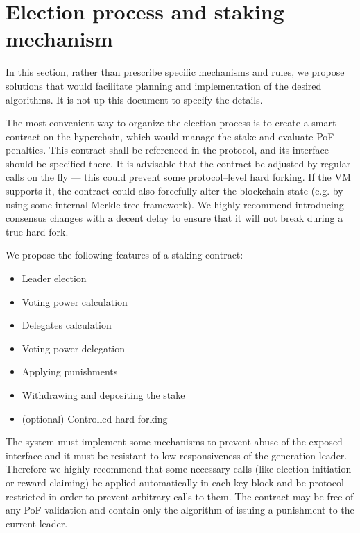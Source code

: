 \section{Election process and staking mechanism}

In this section, rather than prescribe specific mechanisms and rules, we propose
solutions that would facilitate planning and implementation of the desired
algorithms. It is not up this document to specify the details.

The most convenient way to organize the election process is to create a smart
contract on the hyperchain, which would manage the stake and evaluate PoF
penalties. This contract shall be referenced in the protocol, and its interface
should be specified there. It is advisable that the contract be adjusted by
regular calls on the fly — this could prevent some protocol–level hard forking.
If the VM supports it, the contract could also forcefully alter the blockchain
state (e.g. by using some internal Merkle tree framework). We highly recommend
introducing consensus changes with a decent delay to ensure that it will not
break during a true hard fork.

We propose the following features of a staking contract:

\begin{itemize}
\item Leader election
\item Voting power calculation
\item Delegates calculation
\item Voting power delegation
\item Applying punishments
\item Withdrawing and depositing the stake
\item (optional) Controlled hard forking
\end{itemize}

The system must implement some mechanisms to prevent abuse of the exposed
interface and it must be resistant to low responsiveness of the generation
leader. Therefore we highly recommend that some necessary calls (like election
initiation or reward claiming) be applied automatically in each key block and be
protocol–restricted in order to prevent arbitrary calls to them. The contract
may be free of any PoF validation and contain only the algorithm of issuing a
punishment to the current leader.
